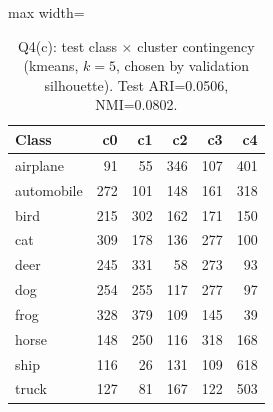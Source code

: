 \begin{table}[!tbp]\centering\footnotesize\setlength{\tabcolsep}{3pt}
\begin{adjustbox}{max width=\columnwidth}
\begin{tabular}{lrrrrr}\toprule
Class & c0 & c1 & c2 & c3 & c4 \\\midrule
airplane & 91 & 55 & 346 & 107 & 401 \\
automobile & 272 & 101 & 148 & 161 & 318 \\
bird & 215 & 302 & 162 & 171 & 150 \\
cat & 309 & 178 & 136 & 277 & 100 \\
deer & 245 & 331 & 58 & 273 & 93 \\
dog & 254 & 255 & 117 & 277 & 97 \\
frog & 328 & 379 & 109 & 145 & 39 \\
horse & 148 & 250 & 116 & 318 & 168 \\
ship & 116 & 26 & 131 & 109 & 618 \\
truck & 127 & 81 & 167 & 122 & 503 \\
\bottomrule\end{tabular}
\end{adjustbox}
\caption{Q4(c): test class $\times$ cluster contingency (kmeans, $k=5$, chosen by validation silhouette). Test ARI=0.0506, NMI=0.0802.}\label{tab:q4c}\end{table}
